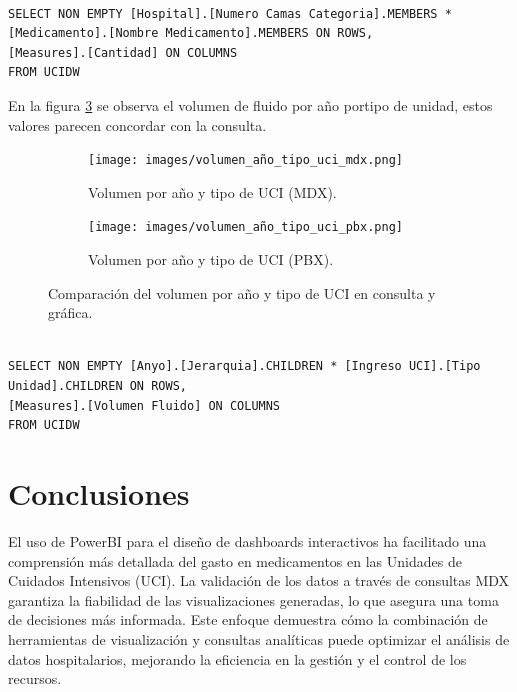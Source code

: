 \documentclass{article}
\begin{document}
\begin{lstlisting}[style=ddlstyle, label=lst:consulta6, caption=Cantidad por Medicamento y Número de Camas]

SELECT NON EMPTY [Hospital].[Numero Camas Categoria].MEMBERS * [Medicamento].[Nombre Medicamento].MEMBERS ON ROWS, 
[Measures].[Cantidad] ON COLUMNS
FROM UCIDW
\end{lstlisting}

En la figura \ref{fig:volumen_tipo_uci_comparacion} se observa el volumen de fluido por año portipo de unidad, estos valores parecen concordar con la consulta.
\begin{figure}[H]
	\centering
	\begin{subfigure}[b]{0.4\textwidth}
		\centering
		\texttt{[image: images/volumen\_año\_tipo\_uci\_mdx.png]}
		\caption{Volumen por año y tipo de UCI (MDX).}
		\label{fig:volumen_tipo_uci_mdx}
	\end{subfigure}
	\hfill
	\begin{subfigure}[b]{0.4\textwidth}
		\centering
		\texttt{[image: images/volumen\_año\_tipo\_uci\_pbx.png]}
		\caption{Volumen por año y tipo de UCI (PBX).}
		\label{fig:volumen_tipo_uci_pbx}
	\end{subfigure}
	\caption{Comparación del volumen por año y tipo de UCI en consulta y gráfica.}
	\label{fig:volumen_tipo_uci_comparacion}
\end{figure}

\begin{lstlisting}[style=ddlstyle, label=lst:consulta7, caption=Volúmen por Año y Tipo de UCI]

SELECT NON EMPTY [Anyo].[Jerarquia].CHILDREN * [Ingreso UCI].[Tipo Unidad].CHILDREN ON ROWS, 
[Measures].[Volumen Fluido] ON COLUMNS
FROM UCIDW

\end{lstlisting}


\section{Conclusiones}
\label{sec:conclusiones}

El uso de PowerBI para el diseño de dashboards interactivos ha facilitado una comprensión más detallada del gasto en medicamentos en las Unidades de Cuidados Intensivos (UCI). La validación de los datos a través de consultas MDX garantiza la fiabilidad de las visualizaciones generadas, lo que asegura una toma de decisiones más informada. Este enfoque demuestra cómo la combinación de herramientas de visualización y consultas analíticas puede optimizar el análisis de datos hospitalarios, mejorando la eficiencia en la gestión y el control de los recursos.
\end{document}
